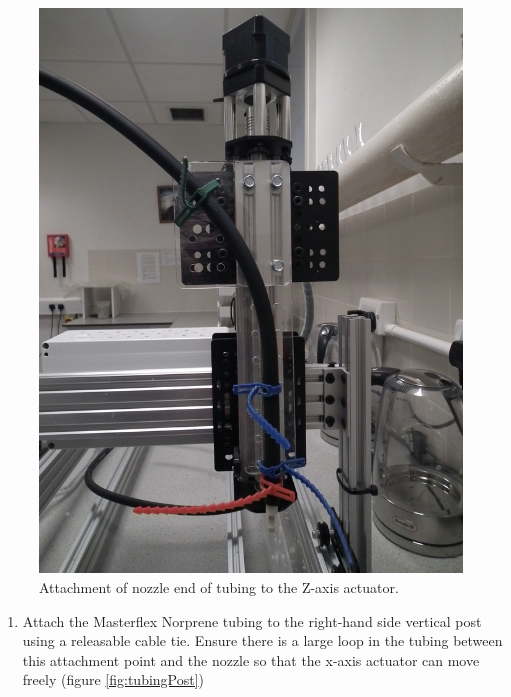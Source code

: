 \documentclass[]{book}
\providecommand{\tightlist}{%
  \setlength{\itemsep}{0pt}\setlength{\parskip}{0pt}}
\theoremstyle{definition}
\theoremstyle{definition}
\theoremstyle{remark}
\begin{document}
\begin{figure}

{\centering \includegraphics[width=0.75\linewidth]{images/pump4} 

}

\caption{Attachment of nozzle end of tubing to the Z-axis actuator.}\label{fig:attachNozzle}
\end{figure}

\begin{enumerate}
\def\labelenumi{\arabic{enumi}.}
\setcounter{enumi}{1}
\tightlist
\item
  Attach the Masterflex Norprene tubing to the right-hand side vertical
  post using a releasable cable tie. Ensure there is a large loop in the
  tubing between this attachment point and the nozzle so that the x-axis
  actuator can move freely (figure \ref{fig:tubingPost})
\end{enumerate}
\end{document}
